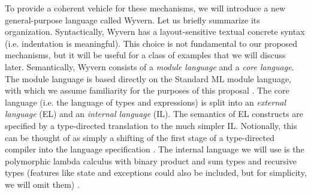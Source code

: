 





To provide a coherent vehicle for these mechanisms, we will introduce a new general-purpose language called Wyvern. Let us briefly summarize its organization. Syntactically, Wyvern has a layout-sensitive textual concrete syntax (i.e. indentation is meaningful). This choice is not fundamental to our proposed mechanisms, but it will be useful for a class of examples that we will discuss later.  Semantically, Wyvern consists of a \emph{module language} and a \emph{core language}. The module language is based directly on the Standard ML module language, with which we assume familiarity for the purposes of this proposal \cite{harper1997programming}. The core language (i.e. the language of types and expressions) is split into an \emph{external language} (EL) and an \emph{internal language} (IL). The semantics of EL constructs are specified by a type-directed translation to the much simpler IL. Notionally, this can be thought of as simply a shifting of the first stage of a type-directed compiler into the language specification \cite{tarditi+:til-OLD}. The internal language we will use is the polymorphic lambda calculus with binary product and sum types and recursive types (features like state and exceptions could also be included, but for simplicity, we will omit them) \cite{pfpl}. %

